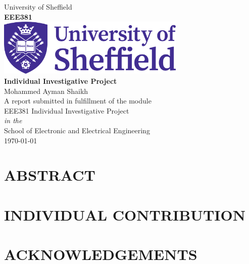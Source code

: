 \documentclass[12pt,a4paper]{report}
\begin{document}
\setcounter{tocdepth}{0} 
\renewcommand\labelitemi{---}


\begin{titlepage}
\begin{center}
{\LARGE University of Sheffield}\\[1.5cm]
\linespread{1.2}\Large {\bfseries EEE381}\\[2cm]
\linespread{1}
\includegraphics[width=9cm]{images/logo.png}\\[1.5cm]

\linespread{1.2}\Large {\bfseries Individual Investigative Project}\\[1cm]
{\Large Mohammed Ayman Shaikh}\\[1cm]
\large A report submitted in fulfillment of the module\\EEE381 Individual Investigative Project\\[0.3cm] 
\textit{in the}\\[0.3cm]
School of Electronic and Electrical Engineering\\[2cm]
\today
\end{center}

\end{titlepage}


\linespread{1.5}

\section*{ABSTRACT}


\newpage \section*{INDIVIDUAL CONTRIBUTION}


\newpage \section*{ACKNOWLEDGEMENTS}
\end{document}
